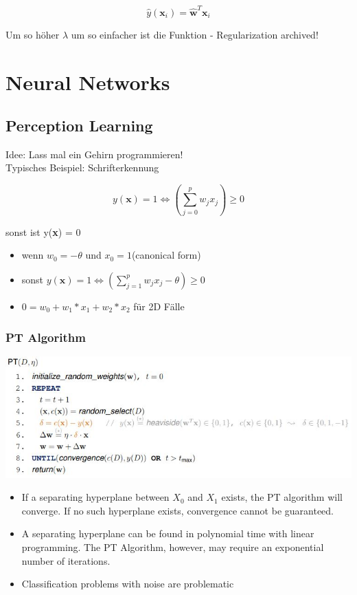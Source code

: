 \documentclass[11pt,a4paper]{article}
\begin{document}
\begin{flushleft}
$$ \hat{y}(\textbf{x}_i) = \mathbf{\hat{w}}^T \textbf{x}_i $$

Um so höher $\lambda$ um so einfacher ist die Funktion - Regularization archived!

\section{Neural Networks}

\subsection{Perception Learning}
Idee: Lass mal ein Gehirn programmieren! \\
Typisches Beispiel: Schrifterkennung 

$$ y(\textbf{x}) = 1 \Leftrightarrow (\displaystyle\sum_{j=0}^p w_j x_j  ) \geq 0  $$

sonst ist y(\textbf{x}) = 0

\begin{itemize}
\item wenn $w_0 = -\theta$ und $x_0 = 1$(canonical form) 
\item sonst $ y(\textbf{x}) = 1 \Leftrightarrow (\displaystyle\sum_{j=1}^p w_j x_j - \theta ) \geq 0 $
\item $ 0 = w_0 + w_1 * x_1 + w_2 * x_2 $ für 2D Fälle
\end{itemize}

\subsubsection{PT Algorithm}
\includegraphics[width=\textwidth]{PT}
\begin{itemize}
\item If a separating hyperplane between $X_0$ and $X_1$ exists, the PT algorithm will
converge. If no such hyperplane exists, convergence cannot be guaranteed.
\item A separating hyperplane can be found in polynomial time with linear
programming. The PT Algorithm, however, may require an exponential
number of iterations.
\item Classification problems with noise are problematic
\end{itemize}

\end{flushleft}
\end{document}
